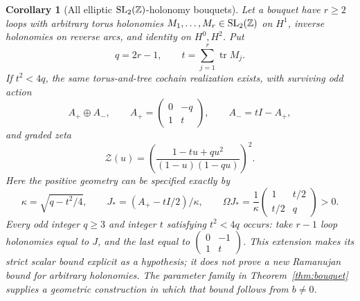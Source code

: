 \documentclass[11pt,a4paper]{article}
\newtheorem{corollary}[definition]{Corollary}
\theoremstyle{remark}\newtheorem{remark}[definition]{Remark}
\newcommand{\tr}{\operatorname{tr}}\newcommand{\im}{\operatorname{im}}
\begin{document}
\begin{corollary}[All elliptic $\mathrm{SL}_2(\mathbb Z)$-holonomy bouquets]\label{cor:sl2}
Let a bouquet have $r\ge2$ loops with arbitrary torus holonomies
$M_1,\ldots,M_r\in\mathrm{SL}_2(\mathbb Z)$ on $H^1$, inverse holonomies on reverse arcs, and identity on $H^0,H^2$. Put
\[
q=2r-1,\qquad t=\sum_{j=1}^r\tr M_j.
\]
If $t^2<4q$, the same torus-and-tree cochain realization exists, with surviving odd action
\[
A_+\oplus A_-,\qquad A_+=\begin{pmatrix}0&-q\\1&t\end{pmatrix},
\qquad A_-=tI-A_+,
\]
and graded zeta
\[
\mathcal Z(u)=\left(\frac{1-tu+qu^2}{(1-u)(1-qu)}\right)^2.
\]
Here the positive geometry can be specified exactly by
\[
\kappa=\sqrt{q-t^2/4},\qquad J_*=(A_+-tI/2)/\kappa,
\qquad \Omega J_*=\frac1\kappa\begin{pmatrix}1&t/2\\t/2&q\end{pmatrix}>0.
\]
Every odd integer $q\ge3$ and integer $t$ satisfying $t^2<4q$ occurs: take $r-1$ loop holonomies equal to $J$, and the last equal to
$\left(\begin{smallmatrix}0&-1\\1&t\end{smallmatrix}\right)$.
This extension makes its strict scalar bound explicit as a hypothesis; it does not prove a new Ramanujan bound for arbitrary holonomies. The parameter family in Theorem~\ref{thm:bouquet} supplies a geometric construction in which that bound follows from $b\ne0$.
\end{corollary}
\end{document}
